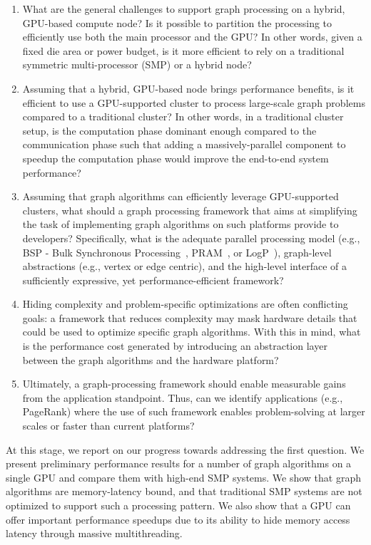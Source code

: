 \begin{enumerate}
\item What are the general challenges to support graph processing on a hybrid, GPU-based compute node? Is it possible to partition the processing to efficiently use both the main processor and the GPU? In other words, given a fixed die area or power budget, is it more efficient to rely on a traditional symmetric multi-processor (SMP) or a hybrid node?

\item Assuming that a hybrid, GPU-based node brings performance benefits, is it efficient to use a GPU-supported cluster to process large-scale graph problems compared to a traditional cluster? In other words, in a traditional cluster setup, is the computation phase dominant enough compared to the communication phase such that adding a massively-parallel component to speedup the computation phase would improve the end-to-end system performance?

\item Assuming that graph algorithms can efficiently leverage GPU-supported clusters, what should a graph processing framework that aims at simplifying the task of implementing graph algorithms on such platforms provide to developers? Specifically, what is the adequate parallel processing model (e.g., BSP - Bulk Synchronous Processing~\cite{Valiant1990}, PRAM~\cite{Fortune78}, or LogP~\cite{Culler1996}), graph-level abstractions (e.g., vertex or edge centric), and the high-level interface of a sufficiently expressive, yet performance-efficient framework?

\item Hiding complexity and problem-specific optimizations are often conflicting goals: a framework that reduces complexity may mask hardware details that could be used to optimize specific graph algorithms. With this in mind, what is the performance cost generated by introducing an abstraction layer between the graph algorithms and the hardware platform?

\item Ultimately, a graph-processing framework should enable measurable gains from the application standpoint. Thus, can we identify applications (e.g., PageRank) where the use of such framework enables problem-solving at larger scales or faster than current platforms?

\end{enumerate}

At this stage, we report on our progress towards addressing the first question. We present preliminary performance results for a number of graph algorithms on a single GPU and compare them with high-end SMP systems. We show that graph algorithms are memory-latency bound, and that traditional SMP systems are not optimized to support such a processing pattern. We also show that a GPU can offer important performance speedups due to its ability to hide memory access latency through massive multithreading.

